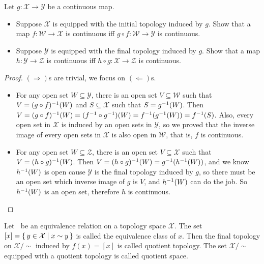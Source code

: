 \documentclass[./main.tex]{subfiles}
\begin{document}
\begin{theorem}
  Let $g : \mathcal{X} \rightarrow \mathcal{Y}$ be a continuous map.
  \begin{itemize}
    \item Suppose $\mathcal{X}$ is equipped with the initial topology induced by $g$. Show that
          a map $f : \mathcal{W} \rightarrow \mathcal{X}$ is continuous iff
          $g \circ f : \mathcal{W} \rightarrow \mathcal{Y}$ is continuous.
    \item Suppose $\mathcal{Y}$ is equipped with the final topology induced by $g$. Show that
          a map $h : \mathcal{Y} \rightarrow \mathcal{Z}$ is continuous iff
          $h \circ g : \mathcal{X} \rightarrow \mathcal{Z}$ is continuous.
  \end{itemize}
\end{theorem}
\begin{proof}
  $(\Rightarrow)$s are trivial, we focus on $(\Leftarrow)$s.
  \begin{itemize}
    \item For any open set $W \subseteq \mathcal{Y}$, 
          there is an open set $V \subseteq \mathcal{W}$ such that $V = (g \circ f)^{-1}(W)$
          and $S \subseteq \mathcal{X}$ such that $S = g^{-1}(W)$.
          Then $V = (g \circ f)^{-1}(W) = (f^{-1} \circ g^{-1})(W) = f^{-1}(g^{-1}(W)) = f^{-1}(S)$.
          Also, every open set in $\mathcal{X}$ is induced by an open sets in $\mathcal{Y}$, so
          we proved that the inverse image of every open sets in $\mathcal{X}$ is also open in $\mathcal{W}$,
          that is, $f$ is continuous.
    \item For any open set $W \subseteq \mathcal{Z}$,
          there is an open set $V \subseteq \mathcal{X}$ such that $V = (h \circ g)^{-1}(W)$.
          Then $V = (h \circ g)^{-1}(W) = g^{-1}(h^{-1}(W))$, and we know $h^{-1}(W)$ is open
          cause $\mathcal{Y}$ is the final topology induced by $g$, so there must be
          an open set which inverse image of $g$ is $V$, and $h^{-1}(W)$ can do the job.
          So $h^{-1}(W)$ is an open set, therefore $h$ is continuous.
  \end{itemize}
\end{proof}

\begin{definition}
  Let $~$ be an equivalence relation on a topology space $\mathcal{X}$.
  The set $[x] = \set{ y \in \mathcal{X} | x \sim y }$ is called the equivalence
  class of $x$. Then the final topology on $\mathcal{X}/\sim$ induced by $f(x) = [x]$ is called
  quotient topology. The set $\mathcal{X}/\sim$ equipped with a quotient topology is called quotient space.
\end{definition}
\end{document}
